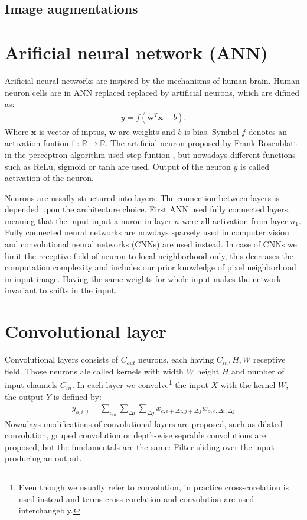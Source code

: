 \subsection{Image augmentations}


\section{Arificial neural network (ANN)}
Arificial neural networks are inspired by the mechanisms of human brain. Human neuron cells are in ANN replaced replaced by artificial neurons, which are difined as:
\begin{align}
    y = f \left( \boldsymbol{w}^T \boldsymbol{x}  + b \right).
\end{align}
Where $\boldsymbol{x}$ is vector of inptus, $\boldsymbol{w}$ are weights and $b$ is bias. Symbol $f$ denotes an activation funtion f : $\mathbb{R} \rightarrow \mathbb{R}$. The artificial neuron proposed by Frank Rosenblatt in the perceptron algorithm used step funtion \cite{Rosenblatt1958}, but nowadays different functions such as ReLu, sigmoid or tanh are used. Output of the neuron $y$ is called activation of the neuron.

Neurons are ussally structured into layers. The connection between layers is depended upon the architecture choice. First ANN used fully connected layers, meaning that the input input a nuron in layer $n$ were all activation from layer $n_1$. Fully connected neural networks are nowdays sparsely used in computer vision and convolutional neural networks (CNNs) are used instead. In case of CNNs we limit the receptive field of neuron to local neighborhood only, this decreases the computation complexity and includes our prior knowledge of pixel neighborhood in input image. Having the same weights for whole input makes the network invariant to shifts in the input.

\section{Convolutional layer}
Convolutional layers consists of $C_{out}$ neurons, each having $C_{in}, H, W$ receptive field. Those neurons ale called kernels with width $W$ height $H$ and number of input channels $C_{in}$. In each layer we convolve\footnote{Even though we usually refer to convolution, in practice cross-corelation is used instead and terms cross-corelation and convolution are used interchangebly.} the input $X$  with the kernel $W$, the output $Y$ is defined by:
\begin{align}
    y_{o,i,j} = \sum_{c_{in}} \sum_{\Delta i} \sum_{\Delta j} x_{c, i+\Delta i, j + \Delta j}  w_{o,c, \Delta i, \Delta j}
\end{align}
Nowadays modifications of convolutional layers are proposed, such as dilated convolution, gruped convolution or depth-wise seprable convolutions are proposed, but the fundamentals are the same: Filter sliding over the input producing an output.


